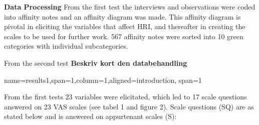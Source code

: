 \documentclass[paperwidth=160cm,paperheight=100cm,landscape,fontscale=0.3010]{baposter}
\begin{document}
\begin{poster}
{\textbf{Data Processing}
From the first test the interviews and observations were coded into affinity notes and an affinity diagram was made. This affinity diagram is pivotal in eliciting the variables that affect HRI, and thereafter in creating the scales to be used for further work. 
567 affinity notes were sorted into 10 green categories with individual subcategories. 

From the second test \textbf{Beskriv kort den databehandling}
}


{name=results1,span=1,column=1,aligned=introduction, span=1}
{\parskip 5pt 
From the first tests 23 variables were elicitated, which led to 17 scale questions answered on 23 VAS scales (see tabel 1 and figure 2). Scale questions (SQ) are as stated below and is answered on appurtenant scales (S):\\
\vspace{-20pt}
  
}
\end{poster}
\end{document}
